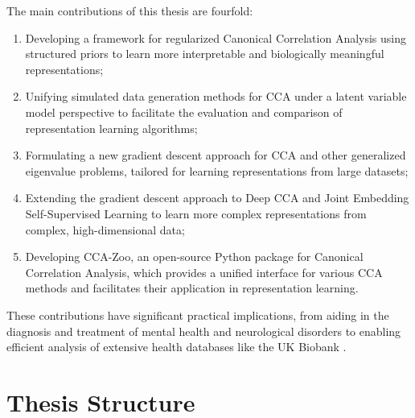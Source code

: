 The main contributions of this thesis are fourfold:
\begin{enumerate}
\item Developing a framework for regularized Canonical Correlation Analysis using structured priors to learn more interpretable and biologically meaningful representations;
\item Unifying simulated data generation methods for CCA under a latent variable model perspective to facilitate the evaluation and comparison of representation learning algorithms;
\item Formulating a new gradient descent approach for CCA and other generalized eigenvalue problems, tailored for learning representations from large datasets;
\item Extending the gradient descent approach to Deep CCA and Joint Embedding Self-Supervised Learning to learn more complex representations from complex, high-dimensional data;
\item Developing CCA-Zoo, an open-source Python package for Canonical Correlation Analysis, which provides a unified interface for various CCA methods and facilitates their application in representation learning.
\end{enumerate}
These contributions have significant practical implications, from aiding in the diagnosis and treatment of mental health and neurological disorders to enabling efficient analysis of extensive health databases like the UK Biobank \citep{biobank2014uk}.

\section*{Thesis Structure}

